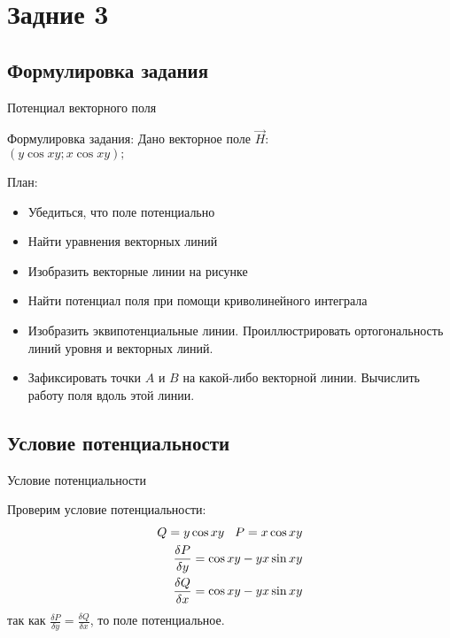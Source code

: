 \section{Задние 3}
\subsection{Формулировка задания}
\begin{frame}{Потенциал векторного поля} %
\begin{block}{Формулировка задания:}
\centering
Дано векторное поле $\vec{H}$: \\
$(y\cos{xy};x\cos{xy});$
\end{block}
\begin{block}{План:}
\begin{itemize}
    \item Убедиться, что поле потенциально
    \item Найти уравнения векторных линий
    \item Изобразить векторные линии на рисунке
    \item Найти потенциал поля при помощи криволинейного интеграла
    \item Изобразить эквипотенциальные линии. Проиллюстрировать ортогональность линий уровня и векторных линий. 
    \item Зафиксировать точки $A$ и $B$ на какой-либо векторной линии. Вычислить работу поля вдоль этой линии. 
\end{itemize}
\end{block}
\end{frame}


\subsection{Условие потенциальности}
\begin{frame}{Условие потенциальности}
\begin{block}{Проверим условие потенциальности:}
\begin{align*}
      Q = y\cos{xy} \hspace{3mm} P = x\cos{xy} \\
      \frac{\delta P}{\delta y} = \cos{xy} - yx\sin{xy} \\
      \frac{\delta Q}{\delta x} = \cos{xy} - yx\sin{xy} \\
\end{align*}
\centering
так как $\frac{\delta P}{\delta y} =  \frac{\delta Q}{\delta x}$, то поле потенциальное. 
\end{block}
\end{frame}


